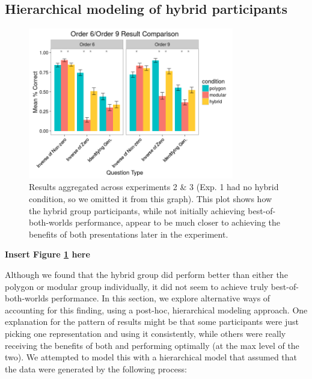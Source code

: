 \documentclass[man,10pt]{apa6}
\begin{document}
\subsection{Hierarchical modeling of hybrid participants}
\begin{figure}
\centering
\includegraphics[width=0.8\textwidth]{figures/order_69_results.png}
\caption{Results aggregated across experiments 2 \& 3 (Exp. 1 had no hybrid condition, so we omitted it from this graph). This plot shows how the hybrid group participants, while not initially achieving best-of-both-worlds performance, appear to be much closer to achieving the benefits of both presentations later in the experiment.}
\label{order_69_results}
\end{figure}
\begin{center} 
{\bf Insert Figure \ref{order_69_results} here} 
\end{center}
Although we found that the hybrid group did perform better than either the polygon or modular group individually, it did not seem to achieve truly best-of-both-worlds performance. In this section, we explore alternative ways of accounting for this finding, using a post-hoc, hierarchical modeling \cite{Gelman2006} approach. One explanation for the pattern of results might be that some participants were just picking one representation and using it consistently, while others were really receiving the benefits of both and performing optimally (at the max level of the two). We attempted to model this with a hierarchical model that assumed that the data were generated by the following process: 
\end{document}
